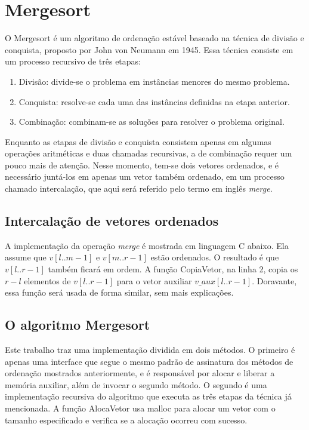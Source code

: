 \section{Mergesort}
O Mergesort é um algoritmo de ordenação estável baseado na técnica de divisão e conquista, proposto por John von Neumann em 1945. Essa técnica consiste em um processo recursivo de três etapas:
\begin{enumerate}
    \item Divisão: divide-se o problema em instâncias menores do mesmo problema.
    \item Conquista: resolve-se cada uma das instâncias definidas na etapa anterior.
    \item Combinação: combinam-se as soluções para resolver o problema original.
\end{enumerate}

Enquanto as etapas de divisão e conquista consistem apenas em algumas operações aritméticas e duas chamadas recursivas, a de combinação requer um pouco mais de atenção. Nesse momento, tem-se dois vetores ordenados, e é necessário juntá-los em apenas um vetor também ordenado, em um processo chamado intercalação, que aqui será referido pelo termo em inglês \textit{merge}.

\subsection*{Intercalação de vetores ordenados}
A implementação da operação \textit{merge} é mostrada em linguagem C abaixo. Ela assume que $v[l..m - 1]$ e $v[m..r - 1]$ estão ordenados. O resultado é que $v[l..r - 1]$ também ficará em ordem. A função CopiaVetor, na linha 2, copia os $r - l$ elementos de $v[l..r - 1]$ para o vetor auxiliar $v\_aux[l..r - 1]$. Doravante, essa função será usada de forma similar, sem mais explicações.



\subsection*{O algoritmo Mergesort}
Este trabalho traz uma implementação dividida em dois métodos. O primeiro é apenas uma interface que segue o mesmo padrão de assinatura dos métodos de ordenação mostrados anteriormente, e é responsável por alocar e liberar a memória auxiliar, além de invocar o segundo método. O segundo é uma implementação recursiva do algoritmo que executa as três etapas da técnica já mencionada. A função AlocaVetor usa malloc para alocar um vetor com o tamanho especificado e verifica se a alocação ocorreu com sucesso.

